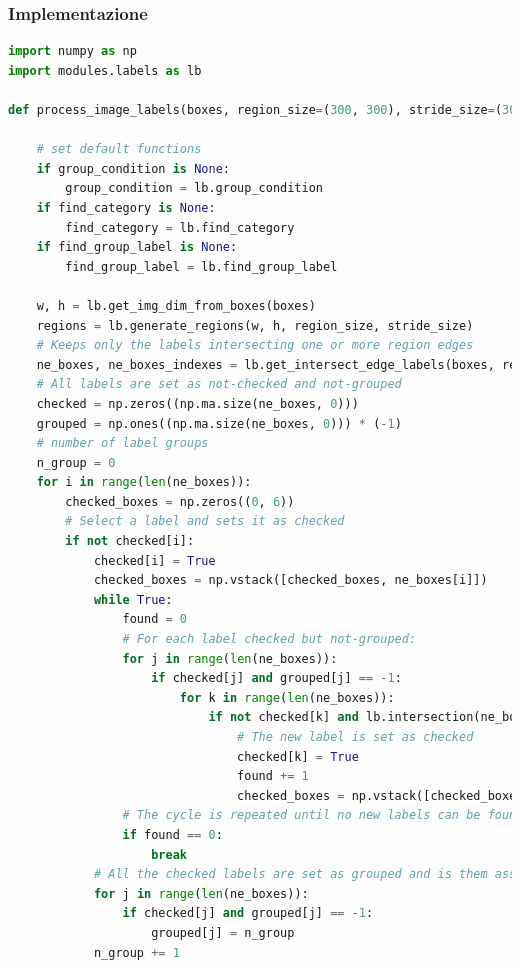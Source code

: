 \subsubsection{Implementazione}
\begin{lstlisting}[language=Python, caption=Python example]
import numpy as np
import modules.labels as lb

def process_image_labels(boxes, region_size=(300, 300), stride_size=(300, 300), overlap=(0, 0), tol=0, threshold_match=50, group_condition=None, find_category=None, find_group_label=None):

    # set default functions
    if group_condition is None:
        group_condition = lb.group_condition
    if find_category is None:
        find_category = lb.find_category
    if find_group_label is None:
        find_group_label = lb.find_group_label

    w, h = lb.get_img_dim_from_boxes(boxes)
    regions = lb.generate_regions(w, h, region_size, stride_size)
    # Keeps only the labels intersecting one or more region edges
    ne_boxes, ne_boxes_indexes = lb.get_intersect_edge_labels(boxes, regions, tol, overlap)
    # All labels are set as not-checked and not-grouped
    checked = np.zeros((np.ma.size(ne_boxes, 0)))
    grouped = np.ones((np.ma.size(ne_boxes, 0))) * (-1)
    # number of label groups
    n_group = 0
    for i in range(len(ne_boxes)):
        checked_boxes = np.zeros((0, 6))
        # Select a label and sets it as checked
        if not checked[i]:
            checked[i] = True
            checked_boxes = np.vstack([checked_boxes, ne_boxes[i]])
            while True:
                found = 0
                # For each label checked but not-grouped:
                for j in range(len(ne_boxes)):
                    if checked[j] and grouped[j] == -1:
                        for k in range(len(ne_boxes)):
                            if not checked[k] and lb.intersection(ne_boxes[j], ne_boxes[k], tol) and group_condition(ne_boxes[j], ne_boxes[k]) and lb.intersect_common_edge(ne_boxes[j], ne_boxes[k], regions, tol, overlap) and lb.matched(ne_boxes[j], ne_boxes[k], threshold_match) and not lb.belong_same_region_strict_group(ne_boxes[k], checked_boxes, regions, 0):
                                # The new label is set as checked
                                checked[k] = True
                                found += 1
                                checked_boxes = np.vstack([checked_boxes, ne_boxes[k]])
                # The cycle is repeated until no new labels can be found
                if found == 0:
                    break
            # All the checked labels are set as grouped and is them assigned a number with the purpose to identify their group ID
            for j in range(len(ne_boxes)):
                if checked[j] and grouped[j] == -1:
                    grouped[j] = n_group
            n_group += 1


\end{lstlisting}

